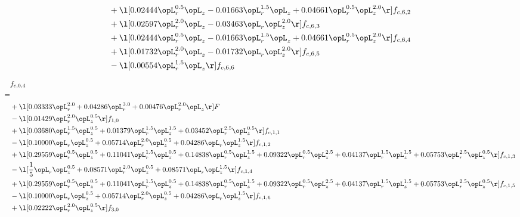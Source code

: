 \begin{alignat}{2}
& + \l[  0.02444 \opL_r^{0.5} \opL_z   -0.01663 \opL_r^{1.5} \opL_z +  0.04661 \opL_r^{0.5} \opL_z^{2.0}  \r] f_{c,6,2} \nonumber \\ 
& + \l[  0.02597 \opL_r^{2.0} \opL_z   -0.03463 \opL_r \opL_z^{2.0}  \r] f_{c,6,3} \nonumber \\ 
& + \l[  0.02444 \opL_r^{0.5} \opL_z   -0.01663 \opL_r^{1.5} \opL_z +  0.04661 \opL_r^{0.5} \opL_z^{2.0}  \r] f_{c,6,4} \nonumber \\ 
& + \l[  0.01732 \opL_r^{2.0} \opL_z   -0.01732 \opL_r \opL_z^{2.0}  \r] f_{c,6,5} \nonumber \\ 
& - \l[  0.00554 \opL_r^{1.5} \opL_z  \r] f_{c,6,6} \nonumber \\ 
\end{alignat} 


\begin{alignat}{2} 
\label{eq:f_04_1} 
& f_{c,0,4} \nonumber \\ 
 = \\ 
& + \l[  0.03333 \opL_r^{2.0} +  0.04286 \opL_r^{3.0} +  0.00476 \opL_r^{2.0} \opL_z  \r] F \nonumber \\ 
& - \l[  0.01429 \opL_r^{2.0} \opL_z^{0.5}  \r] f_{1,0} \nonumber \\ 
& + \l[  0.03680 \opL_r^{1.5} \opL_z^{0.5} +  0.01379 \opL_r^{1.5} \opL_z^{1.5} +  0.03452 \opL_r^{2.5} \opL_z^{0.5}  \r] f_{c,1,1} \nonumber \\ 
& - \l[  0.10000 \opL_r \opL_z^{0.5} +  0.05714 \opL_r^{2.0} \opL_z^{0.5} +  0.04286 \opL_r \opL_z^{1.5}  \r] f_{c,1,2} \nonumber \\ 
& + \l[  0.29559 \opL_r^{0.5} \opL_z^{0.5} +  0.11041 \opL_r^{1.5} \opL_z^{0.5} +  0.14838 \opL_r^{0.5} \opL_z^{1.5} +  0.09322 \opL_r^{0.5} \opL_z^{2.5} +  0.04137 \opL_r^{1.5} \opL_z^{1.5} +  0.05753 \opL_r^{2.5} \opL_z^{0.5}  \r] f_{c,1,3} \nonumber \\ 
& - \l[ \frac{1}{5} \opL_r \opL_z^{0.5} +  0.08571 \opL_r^{2.0} \opL_z^{0.5} +  0.08571 \opL_r \opL_z^{1.5}  \r] f_{c,1,4} \nonumber \\ 
& + \l[  0.29559 \opL_r^{0.5} \opL_z^{0.5} +  0.11041 \opL_r^{1.5} \opL_z^{0.5} +  0.14838 \opL_r^{0.5} \opL_z^{1.5} +  0.09322 \opL_r^{0.5} \opL_z^{2.5} +  0.04137 \opL_r^{1.5} \opL_z^{1.5} +  0.05753 \opL_r^{2.5} \opL_z^{0.5}  \r] f_{c,1,5} \nonumber \\ 
& - \l[  0.10000 \opL_r \opL_z^{0.5} +  0.05714 \opL_r^{2.0} \opL_z^{0.5} +  0.04286 \opL_r \opL_z^{1.5}  \r] f_{c,1,6} \nonumber \\ 
& + \l[  0.02222 \opL_r^{2.0} \opL_z^{0.5}  \r] f_{3,0} \nonumber \\ 

\end{alignat}
